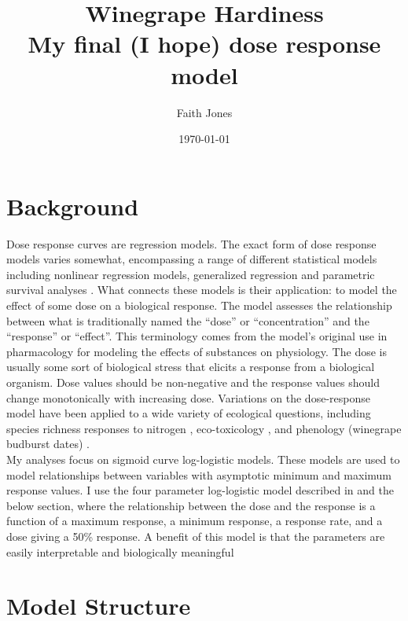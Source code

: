 \documentclass[11pt,letter]{article}
\title{Winegrape Hardiness \\ My final (I hope) dose response model}
\date{\today}
\author{Faith Jones}
\begin{document}
\renewcommand{\bibname}{References}%

{}
\maketitle{}
\tableofcontents

\section{Background}
Dose response curves are regression models. The exact form of dose response models varies somewhat, encompassing a range of different statistical models including nonlinear regression models, generalized regression and parametric survival analyses \cite{Ritz2015}. What connects these models is their application: to model the effect of some dose on a biological response. The model assesses the relationship between what is traditionally named the ``dose'' or ``concentration'' and the ``response'' or ``effect''. This terminology comes from the model's  original use in pharmacology for modeling the effects of substances on physiology. The dose is usually some sort of biological stress that elicits a response from a biological organism. Dose values should be non-negative \cite{Rudemo1989} and the response values should change monotonically with increasing dose. Variations on the dose-response model have been applied to a wide variety of ecological questions, including species richness responses to nitrogen \cite{Jones2018a}, eco-toxicology \cite{Haanstra1985}, and phenology (winegrape budburst dates) \cite{Kovaleski2019}. \\

My analyses focus on sigmoid curve log-logistic models. These models are used to model relationships between variables with asymptotic minimum and maximum response values. I use the four parameter log-logistic model described in \cite{Ritz2015} and the below section, where the relationship between the dose and the response is a function of a maximum response, a minimum response, a response rate, and a dose giving a 50\% response. A benefit of this model is that the parameters are easily interpretable and biologically meaningful \cite{Seefeldt2016}\\

\section{Model Structure}
\end{document}
